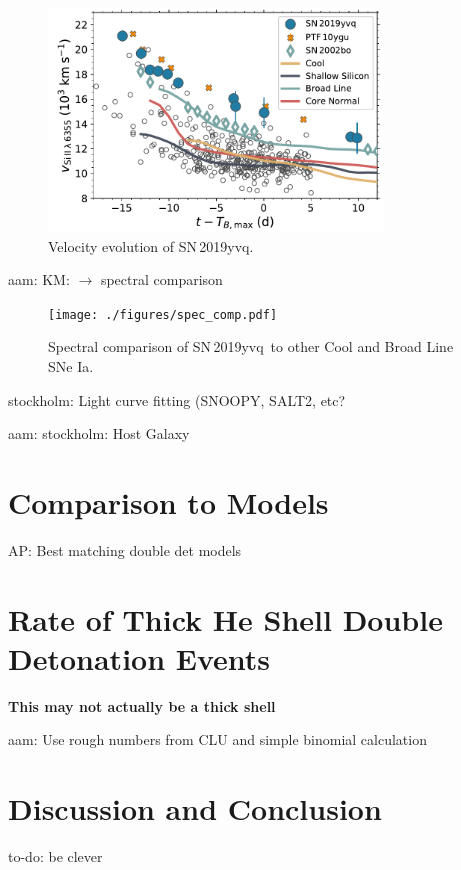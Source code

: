 \documentclass[twocolumn]{aastex63}
\newcommand{\kate}[1]{{\color{red} KM: {#1}}}
\newcommand{\abi}[1]{{\color{LincolnGreen} AP: {#1}}}
\newcommand{\aam}[1]{{\color{DarkOrange} aam: {#1}}}
\newcommand{\stockholm}[1]{{\color{cyan} stockholm: {#1}}}
\newcommand{\todo}[1]{{\color{magenta} to-do: {#1}}}
\newcommand{\sn}{SN\,2019yvq}
\begin{document}
\begin{figure}
    \centering
    \includegraphics[width=3.5in]{./figures/vel_evolution.pdf}
    \caption{Velocity evolution of \sn.}
    \label{fig:vel_evo}
\end{figure}


\aam{\kate{$\longrightarrow$ spectral comparison}}

\begin{figure}
    \centering
    \texttt{[image: ./figures/spec\_comp.pdf]}
    \caption{Spectral comparison of \sn\ to other Cool and Broad Line SNe Ia.}
    \label{fig:spec_comp}
\end{figure}

\stockholm{Light curve fitting (SNOOPY, SALT2, etc?}

\aam{\stockholm{Host Galaxy}}



\section{Comparison to Models}\label{sec:models}

\abi{Best matching double det models}


\section{Rate of Thick He Shell Double Detonation Events}\label{sec:rates}

\textbf{This may not actually be a thick shell}

\aam{Use rough numbers from CLU and simple binomial calculation}

\section{Discussion and Conclusion}\label{sec:conclusions}

\todo{be clever}
\end{document}

